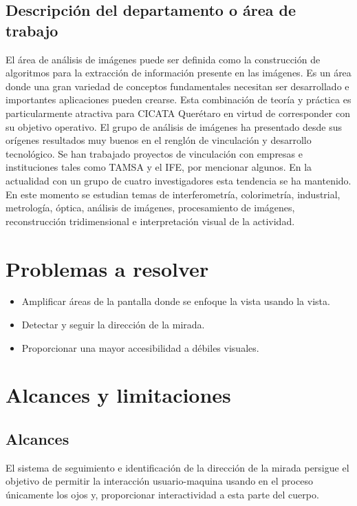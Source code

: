 \documentclass[12pt]{book} %
\begin{document}
	
	\subsection{Descripción del departamento o área de trabajo}
		 El área de análisis de imágenes puede ser definida como la construcción de algoritmos para la extracción de 
		 información presente en las imágenes. Es un área donde una gran variedad de conceptos fundamentales necesitan 
		 ser desarrollado e importantes aplicaciones pueden crearse. Esta combinación de teoría y práctica es particularmente 
		 atractiva para CICATA Querétaro en virtud de corresponder con su objetivo operativo. El grupo de análisis de imágenes 
		 ha presentado desde sus orígenes resultados muy buenos en el renglón de vinculación y desarrollo tecnológico.  
		 Se han trabajado proyectos de vinculación con empresas e instituciones tales como TAMSA y el IFE, por mencionar algunos. 
		 En la actualidad con un grupo de cuatro investigadores esta tendencia se ha mantenido.  En este momento se estudian 
		 temas de interferometría, colorimetría, industrial, metrología, óptica, análisis de imágenes, procesamiento de imágenes, 
		 reconstrucción tridimensional e interpretación visual de la actividad.

\section{Problemas a resolver}
	\begin{multicols}{2}
	\begin{itemize}
		\item Amplificar áreas de la pantalla donde se enfoque la vista usando la vista.
		\item Detectar y seguir la dirección de la mirada.
		\item Proporcionar una mayor accesibilidad a débiles visuales.
	\end{itemize}
	\end{multicols}
\newpage
\section{Alcances y limitaciones}
	\subsection{Alcances}
		El sistema de seguimiento e identificación de la dirección de la mirada persigue el objetivo de permitir la interacción 
		usuario-maquina usando en el proceso únicamente los ojos y, proporcionar interactividad a esta parte del cuerpo.\\
		
\end{document}
